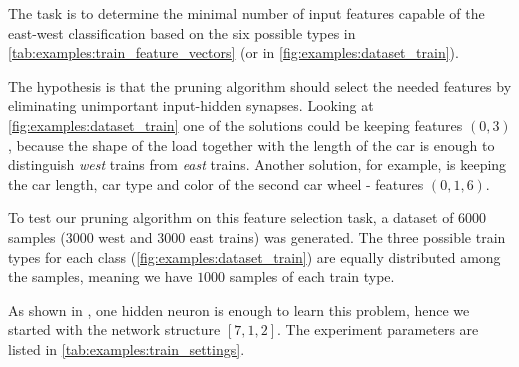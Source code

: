 The task is to determine the minimal number of input features capable of the east-west classification based on the six possible types in \cref{tab:examples:train_feature_vectors} (or in \cref{fig:examples:dataset_train}).

The hypothesis is that the pruning algorithm should select the needed features by eliminating unimportant input-hidden synapses. Looking at \cref{fig:examples:dataset_train} one of the solutions could be keeping features $ (0, 3) $, because the shape of the load together with the length of the car is enough to distinguish \textit{west} trains from \textit{east} trains. Another solution, for example, is keeping the car length, car type and color of the second car wheel - features $ (0, 1, 6) $.

To test our pruning algorithm on this feature selection task, a dataset of $ 6000 $ samples ($ 3000 $ west and $ 3000 $ east trains) was generated. The three possible train types for each class (\cref{fig:examples:dataset_train}) are equally distributed among the samples, meaning we have $ 1000 $ samples of each train type.

As shown in \citep{mozer:skeletonization}, one hidden neuron is enough to learn this problem, hence we started with the network structure $ [7, 1, 2] $. The experiment parameters are listed in \cref{tab:examples:train_settings}.

\begin{table}[H]
\centering
{}
\caption{Experiment settings for the train example.}
\label{tab:examples:train_settings}
\end{table}

